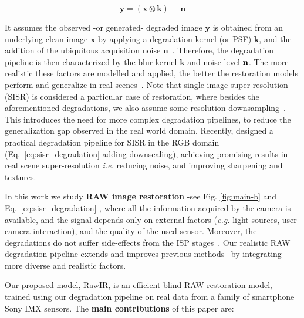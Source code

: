 \documentclass{article}
\newcommand{\ie}{\emph{i.e.} }
\newcommand{\eg}{\emph{e.g.} }
\begin{document}
\begin{equation}\label{eq:sisr_degradation}
  \mathbf{y}\!= \!(\mathbf{x}\otimes \mathbf{k})\! + \,\mathbf{n}
\end{equation}

It assumes the observed -or generated- degraded image $\mathbf{y}$ is obtained from an underlying clean image $\mathbf{x}$ by applying a degradation kernel (or PSF) $\mathbf{k}$, and the addition of the ubiquitous acquisition noise $\mathbf{n}$~\cite{hasinoff2014photon}. Therefore, the degradation pipeline is then characterized by the blur kernel $\mathbf{k}$ and noise level $\bf{n}$. The more realistic these factors are modelled and applied, the better the restoration models perform and generalize in real scenes~\cite{xu2019rawsr, kai2021bsrgan}.
%
Note that single image super-resolution (SISR) is considered a particular case of restoration, where besides the aforementioned degradations, we also assume some resolution downsampling~\cite{kai2021bsrgan}.
This introduces the need for more complex degradation pipelines, to reduce the generalization gap observed in the real world domain. Recently, \cite{kai2021bsrgan} designed a practical degradation pipeline for SISR in the RGB domain (Eq.~\ref{eq:sisr_degradation} adding downscaling), achieving promising results in real scene super-resolution \ie reducing noise, and improving sharpening and textures.

\vspace{2mm}

In this work we study \textbf{RAW image restoration} -see Fig. \ref{fig:main-b} and Eq.~\ref{eq:sisr_degradation}-, where all the information acquired by the camera is available, and the signal depends only on external factors (\eg light sources, user-camera interaction), and the quality of the used sensor. Moreover, the degradations do not suffer side-effects from the ISP stages~\cite{karaimer2016software, delbracio2021mobile}. Our realistic RAW degradation pipeline extends and improves previous methods~\cite{xu2019rawsr, xu2020exploiting} by integrating more diverse and realistic factors.

Our proposed model, RawIR, is an efficient blind RAW restoration model, trained using our degradation pipeline on real data from a family of smartphone Sony IMX sensors. The \textbf{main contributions} of this paper are:
\end{document}

